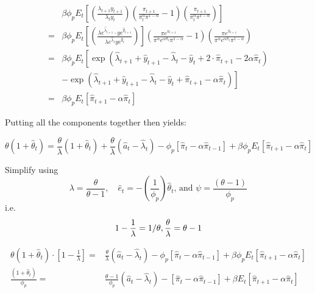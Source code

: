 \documentclass[11pt,preprint, authoryear]{elsarticle}
\numberwithin{equation}{section}
\numberwithin{figure}{section}
\numberwithin{table}{section}
\begin{document}
\[\begin{aligned}
&\beta \phi_{p} E_{t}\left[\left(\frac{\lambda_{t+1} y_{t+1}}{\lambda_{t} y_{t}}\right)\left(\frac{\pi_{t+1}}{\pi_{t}^{\alpha} \pi^{1-\alpha}}-1\right)\left(\frac{\pi_{t+1}}{\pi_{t}^{\alpha} \pi^{1-\alpha}}\right)\right] \\
=& \beta \phi_{p} E_{t}\left[\left(\frac{\lambda e^{\hat{\lambda}_{t+1}} \cdot y e^{\hat{y}_{t+1}}}{\lambda e^{\hat{\lambda}_t} y e^{\hat{y}_t}}\right)\right]\left(\frac{\pi e^{\pi_{t+1}}}{\pi^{\alpha} e^{\alpha \hat{\pi}_{t}} \pi^{1-\alpha}}-1\right)\left(\frac{\pi e^{\hat{\pi}_{t+1}}}{\pi^{\alpha} e^{\alpha \hat{\pi}_{t}} \pi^{1-\alpha}}\right)\\
=& \beta \phi_{p} E_{t}\left[\exp \left(\hat{\lambda}_{t+1}+\hat{y}_{t+1}-\hat{\lambda}_{t}-\hat{y}_{t}+2 \cdot \hat{\pi}_{t+1}-2 \alpha \hat{\pi}_{t}\right)\right.\\
&\left.-\exp \left(\hat{\lambda}_{t+1}+\hat{y}_{t+1}-\hat{\lambda}_{t}-\hat{y}_{t}+\hat{\pi}_{t+1}-\alpha \hat{\pi}_{t}\right)\right] \\
=& \beta \phi_{p} E_{t}\left[ \hat{\pi}_{t+1}-\alpha \hat{\pi}_{t}\right]
\end{aligned}\]

Putting all the components together then yields:

\[ \theta\left(1+\hat{\theta}_{t}\right)=\frac{\theta}{\lambda}\left(1+\hat{\theta}_{t} \right)+ \frac{\theta}{\lambda} \left(\hat{a}_{t}-\hat{\lambda}_{t}\right) - \phi_p\left[\hat{\pi}_{t}-\alpha \hat{\pi}_{t-1}\right] + \beta \phi_{p} E_{t}\left[ \hat{\pi}_{t+1}-\alpha \hat{\pi}_{t}\right] \]

Simplify using
\[\lambda=\frac{\theta}{\theta-1}, \quad \hat{e}_{t}=-\left(\frac{1}{\phi_{p}}\right) \hat{\theta}_{t} \text {, and } \psi=\frac{(\theta-1)}{\phi_{p}}\]
i.e.
\[ 1 - \frac{1}{\lambda} = 1/\theta, \\ \frac{\theta}{\lambda} = \theta - 1 \]

\[\begin{aligned} \theta \left(1+\hat{\theta}_{t}\right)\cdot \left[ 1 - \frac{1}{\lambda} \right] =& \frac{\theta}{\lambda} \left(\hat{a}_{t}-\hat{\lambda}_{t}\right) - \phi_p\left[\hat{\pi}_{t}-\alpha \hat{\pi}_{t-1}\right] + \beta \phi_{p} E_{t}\left[ \hat{\pi}_{t+1}-\alpha \hat{\pi}_{t}\right]\\
 \frac{\left(1+\hat{\theta}_{t}\right)}{\phi_{p}} =& \frac{\theta - 1}{\phi_{p}} \left(\hat{a}_{t}-\hat{\lambda}_{t}\right) - \left[\hat{\pi}_{t}-\alpha \hat{\pi}_{t-1}\right] + \beta E_{t}\left[ \hat{\pi}_{t+1}-\alpha \hat{\pi}_{t}\right]
\end{aligned}\]
\end{document}
